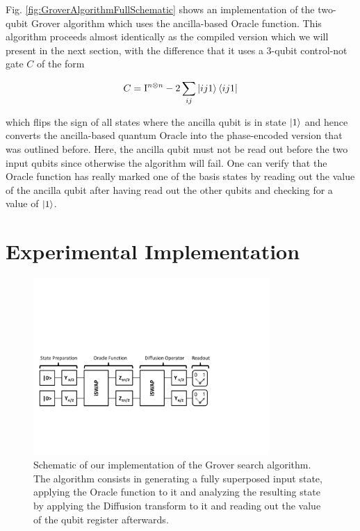 \smallskip

Fig. \ref{fig:GroverAlgorithmFullSchematic} shows an implementation of the two-qubit Grover algorithm which uses the ancilla-based Oracle function. This algorithm proceeds almost identically as the compiled version which we will present in the next section, with the difference that it uses a 3-qubit control-not gate $C$ of the form

\begin{equation}
C = \mathrm{I}^{n\otimes n}-2\sum\limits_{ij} \left| ij1 \right>\left< ij1 \right|
\end{equation}

which flips the sign of all states where the ancilla qubit is in state $\left| 1 \right>$ and hence converts the ancilla-based quantum Oracle into the phase-encoded version that was outlined before. Here, the ancilla qubit must not be read out before the two input qubits since otherwise the algorithm will fail. One can verify that the Oracle function has really marked one of the basis states by reading out the value of the ancilla qubit after having read out the other qubits and checking for a value of $\left| 1 \right>$.

\section{Experimental Implementation}

\begin{figure}[ht!]
	\centering
		\includegraphics[width=0.8\textwidth]{./material/papers/grover/grover_algorithm}
	\caption[Schematic of our implementation of the Grover search algorithm]{Schematic of our implementation of the Grover search algorithm. The algorithm consists in generating a fully superposed input state, applying the Oracle function to it and analyzing the resulting state by applying the Diffusion transform to it and reading out the value of the qubit register afterwards.}
	\label{fig:GroverAlgorithmSchematic}
\end{figure}

